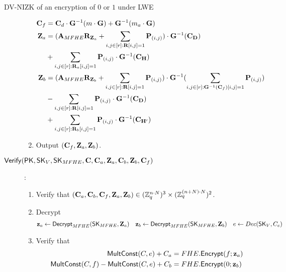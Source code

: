 \begin{subsection}{DV-NIZK of an encryption of $0$ or $1$ under LWE}
\begin{description}
\begin{enumerate}
\begin{align*}
          \mat{C}_f &= \mat{C}_d \cdot \mat{G}^{-1}(m \cdot \mat{G}) + \mat{G}^{-1}(m_a \cdot \mat{G})\\
          \mat{Z}_a &= (\mat{A}_{MFHE} \mat{R}_{\mat{Z}_a}  + \sum_{i,j\in [r]: \mat{R}[i,j] = 1} \mat{P}_{(i,j)}) \cdot \mat{G}^{-1}(\mat{C}_{\mat{D}}) \\
          &+ \sum_{i,j \in [r]: \mat{R}_a[i,j]= 1}\mat{P}_{(i,j)} \cdot \mat{G}^{-1}(\mat{C}_{\mat{H}})\\
          \mat{Z}_b &= (\mat{A}_{MFHE} \mat{R}_{\mat{Z}_b}  + \sum_{i,j\in [r]: \mat{R}[i,j] = 1} \mat{P}_{(i,j)}) \cdot \mat{G}^{-1}(\sum_{i,j\in [r]: \mat{G}^{-1}(\mat{C}_f)[i,j] = 1} \mat{P}_{(i,j)})\\
          &- \sum_{i,j\in [r]: \mat{R}[i,j] = 1} \mat{P}_{(i,j)} \cdot \mat{G}^{-1}(\mat{C}_{\mat{D}}) \\
          &+ \sum_{i,j \in [r]: \mat{R}_b[i,j]= 1}\mat{P}_{(i,j)} \cdot \mat{G}^{-1}(\mat{C}_{\mat{H}\rq{}})\\
        \end{align*}
      \item Output $(\mathbf{C}_f, \mathbf{Z}_a, \mathbf{Z}_b)$.
      \end{enumerate}
      
    \item[${\mathsf{Verify}}(\mathsf{PK}, \mathsf{SK}_{V}, \mathsf{SK}_{MFHE}, \mathbf{C}, \mathbf{C}_a, \mathbf{Z}_a, \mathbf{C}_b, \mathbf{Z}_b, \mathbf{C}_f)$]:
      \begin{enumerate}
      \item Verify that $(\mathbf{C}_a, \mathbf{C}_b, \mathbf{C}_f, \mathbf{Z}_a, \mathbf{Z}_b) \in (\mathbb{Z}_q^{n \cdot N})^3 \times (\mathbb{Z}_q^{(n+N)\cdot N})^2$.
      \item Decrypt
        \begin{align*}
          \mathbf{z}_a &\gets {\mathsf{Decrypt}}_{MFHE}(\mathsf{SK}_{MFHE}, \mathbf{Z}_a) & \mathbf{z}_b &\gets {\mathsf{Decrypt}}_{MFHE}(\mathsf{SK}_{MFHE}, \mathbf{Z}_b) & e &\gets Dec(\mathsf{SK}_{V}, C_e)
        \end{align*}
        
      \item Verify that
        \begin{align*}
          {\mathsf{MultConst}}(C, e)+C_a &= FHE.{\mathsf{Encrypt}}(f; \mathbf{z}_a) \\
          {\mathsf{MultConst}}(C, f) - {\mathsf{MultConst}}(C, e) + C_b &= FHE.{\mathsf{Encrypt}}(0; \mathbf{z}_b)
        \end{align*}
      \end{enumerate}
    \end{description}
\end{subsection}



